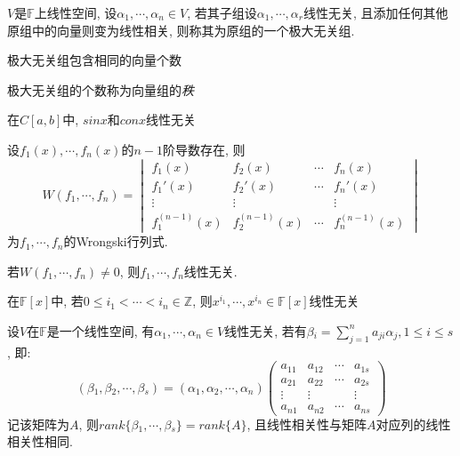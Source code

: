 \begin{definition}[极大无关组]
    $V$是$\mathbb{F}$上线性空间, 设$\alpha{_1}, \cdots, \alpha{_n} \in V$, 若其子组设$\alpha{_1}, \cdots, \alpha{_r}$线性无关, 且添加任何其他原组中的向量则变为线性相关, 则称其为原组的一个极大无关组.
\end{definition}

\begin{inference}
    极大无关组包含相同的向量个数
\end{inference}

\begin{definition}[秩]
    极大无关组的个数称为向量组的\emph{秩}
\end{definition}

\begin{example}
    在$C[a, b]$中, $sinx$和$conx$线性无关 
\end{example}

\begin{definition}[Wrongski行列式]
    设$f_1(x), \cdots, f_n(x)$的$n-1$阶导数存在, 则
    \[W(f_1, \cdots, f_n)=\begin{vmatrix}
        f_1(x) & f_2(x) & \cdots & f_n(x) \\
        f_1'(x) & f_2'(x) & \cdots & f_n'(x) \\
        \vdots & \vdots &         & \vdots \\
        f_1^{(n-1)}(x) & f_2^{(n-1)}(x) & \cdots & f_n^{(n-1)}(x)
    \end{vmatrix} \]
    为$f_1, \cdots, f_n$的Wrongski行列式.
\end{definition}

若$W(f_1, \cdots, f_n) \neq 0$, 则$f_1, \cdots, f_n$线性无关.

\begin{example}
    在$\mathbb{F}[x]$中, 若$0 \le i_1 < \cdots < i_n \in \mathbb{Z} $, 则$x^{i_1}, \cdots, x^{i_n} \in \mathbb{F}[x]$线性无关
\end{example}

\begin{example}
    设$V$在$\mathbb{F}$是一个线性空间, 有$\alpha{_1}, \cdots, \alpha{_n} \in V$线性无关, 若有$\beta{_i}=\sum^n_{j=1}a_{ji}\alpha{_j}, 1 \le i \le s$, 即:
    \[(\beta{_1}, \beta{_2}, \cdots, \beta{_s}) = (\alpha{_1}, \alpha{_2}, \cdots, \alpha{_n}) \begin{pmatrix}
        a_{11} & a_{12} & \cdots & a_{1s} \\
        a_{21} & a_{22} & \cdots & a_{2s} \\
        \vdots & \vdots &        & \vdots \\
        a_{n1} & a_{n2} & \cdots & a_{ns}
    \end{pmatrix}\]
    记该矩阵为$A$, 则$rank\{\beta{_1}, \cdots, \beta{_s}\} = rank\{A\}$, 且线性相关性与矩阵$A$对应列的线性相关性相同.
\end{example}

